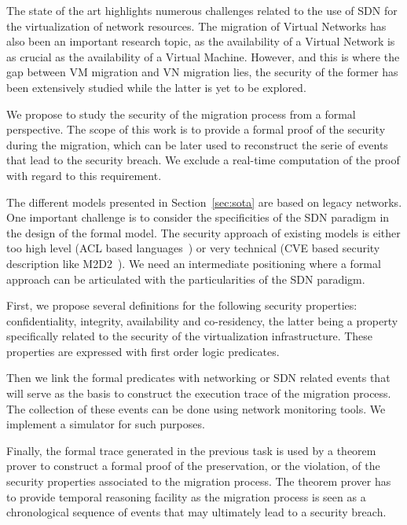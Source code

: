 The state of the art highlights numerous challenges related to the use of SDN for the virtualization of network resources.
The migration of Virtual Networks has also been an important research topic, as the availability of a Virtual Network is as crucial as the availability of a Virtual Machine.
However, and this is where the gap between VM migration and VN migration lies, the security of the former has been extensively studied while the latter is yet to be explored.

We propose to study the security of the migration process from a formal perspective.
The scope of this work is to provide a formal proof of the security during the migration, which can be later used to reconstruct the serie of events that lead to the security breach. We exclude a real-time computation of the proof with regard to this requirement.

The different models presented in Section~\ref{sec:sota} are based on legacy networks.
One important challenge is to consider the specificities of the SDN paradigm in the design of the formal model.
The security approach of existing models is either too high level (ACL based languages~\cite{orbac,mulval-Ou2013}) or very technical (CVE based security description like M2D2~\cite{M2D2-Morin2002}).
We need an intermediate positioning where a formal approach can be articulated with the particularities of the SDN paradigm.

First, we propose several definitions for the following security properties: confidentiality, integrity, availability 
and co-residency, the latter being a property specifically related to the security of the virtualization infrastructure.
These properties are expressed with first order logic predicates.

Then we link the formal predicates with networking or SDN related events that will serve as the basis to construct the execution trace of the migration process.
The collection of these events can be done using network monitoring tools.
We implement a simulator for such purposes.

Finally, the formal trace generated in the previous task is used by a theorem prover to construct a formal proof of the preservation, or the violation, of the security properties associated to the migration process. The theorem prover has to provide temporal reasoning facility as the migration process is seen as a chronological sequence of events that may ultimately lead to a security breach.
